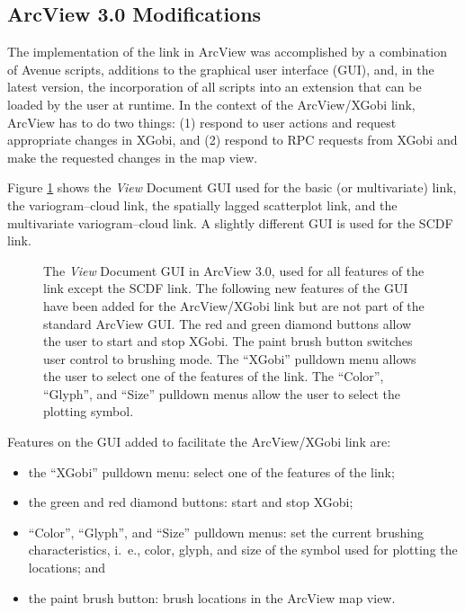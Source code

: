 \subsection{ArcView 3.0 Modifications}

The implementation of the link in ArcView was accomplished
by a combination of Avenue scripts, additions to the
graphical user interface (GUI), and, in the latest version, the
incorporation of all scripts into an extension that can be loaded by
the user at runtime. In the context of the 
ArcView/XGobi link,
ArcView has to do two things: (1) respond 
to user actions and request appropriate changes in XGobi,
and (2) respond to RPC requests from XGobi and make the requested
changes in the map view.

Figure \ref{GUI3.0.ps} shows the {\it View} Document GUI used for the
basic (or multivariate) link, the variogram--cloud link, the spatially
lagged scatterplot link, and the multivariate variogram--cloud
link. A slightly different GUI is used for the
SCDF link.

\begin{figure}[ht]
\centerline{\epsfxsize=6in}
\caption{The {\it View} Document GUI in ArcView 3.0,
used for all features of the link except the SCDF link. 
The following new features of the GUI have been added for the
ArcView/XGobi link but are not part of the standard
ArcView GUI. The red and green
diamond buttons allow the user to start and stop
XGobi. The paint brush button switches user control to brushing mode.
The ``XGobi'' pulldown menu allows the user to select one of the features
of the link. The
``Color'',  ``Glyph'', and ``Size'' pulldown menus allow the user to select
the plotting symbol.}
\label{GUI3.0.ps}
\end{figure}

Features on the GUI added to facilitate the ArcView/XGobi link are:
\begin{itemize}
\item the ``XGobi'' pulldown menu:
select one of the features of the link;
\item the green and red diamond buttons: start and stop XGobi;
\item ``Color'', ``Glyph'', and ``Size'' pulldown menus:
set the current brushing characteristics, i.~e., 
color, glyph, and size of the symbol used for plotting the locations; and
\item the paint brush button: brush locations in the ArcView map view.
\end{itemize}

